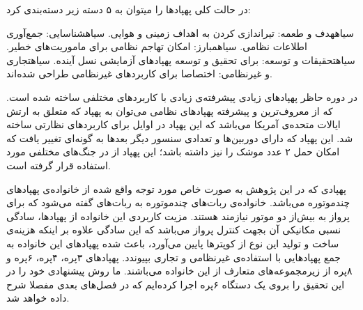 \noindent در حالت کلی پهپادها را میتوان به ۵ دسته زیر دسته‌بندی کرد:
\begin{enumerate}\setlength\itemsep{0em}
 ‌سیاه{هدف و طعمه:} تیراندازی کردن به اهداف زمینی و هوایی.
 ‌سیاه{شناسایی:} جمع‌آوری اطلاعات نظامی.
 ‌سیاه{مبارز:} امکان تهاجم نظامی برای ماموریت‌های خطیر.
 ‌سیاه{تحقیقات و توسعه:} برای تحقیق و توسعه پهپادهای آزمایشی نسل آینده.
 ‌سیاه{تجاری و غیرنظامی:} اختصاصا برای کاربردهای غیرنظامی طراحی شده‌اند.
\end{enumerate}

در دوره حاظر پهپادهای زیادی پیشرفته‌ی زیادی با کاربردهای مختلفی ساخته شده است. که از معروف‌ترین و پیشرفته پهپادهای نظامی می‌توان به پهپاد  که متعلق به ارتش ایالات متحده‌ی آمریکا می‌باشد که این پهپاد در اوایل  برای کاربردهای نظارتی ساخته شد. این پهپاد که دارای دوربین‌ها و تعدادی سنسور دیگر بعدها به گونه‌ای تغییر یافت که امکان حمل ۲ عدد موشک را نیز داشته باشد؛ این پهپاد از  در جنگ‌های مختلفی مورد استفاده قرار گرفته است.


پهپادی که در این پژوهش به صورت خاص مورد توجه واقع شده از خانواده‌ی پهپاد‌های چندموتوره می‌باشد. خانواده‌ی ربات‌های چندموتوره به ربات‌های گفته می‌شود که برای پرواز به بیش‌از دو موتور نیازمند هستند. مزیت کاربردی این خانواده از پهپادها، سادگی نسبی مکانیکی آن بجهت کنترل پرواز می‌باشد که این سادگی علاوه بر اینکه هزینه‌ی ساخت و تولید این نوع از کوپترها پایین می‌آورد، باعث شده پهپادهای این خانواده به جمع پهپادهایی با استفاده‌ی غیرنظامی و تجاری بپیوندد. پهپادهای ۳پره، ۴پره، ۶پره و ۸پره از زیرمجموعه‌های متعارف از این خانواده می‌باشند. ما روش پیشنهادی خود را در این تحقیق را بروی یک دستگاه ۶پره اجرا کرده‌ایم که در فصل‌های بعدی مفصلا شرح داده خواهد شد.

